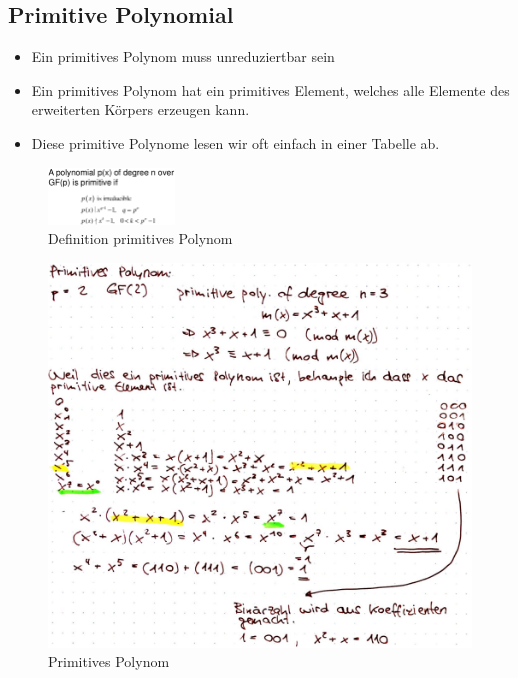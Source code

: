 \hypertarget{primitive-polynomial}{%
\subsection{Primitive Polynomial}\label{primitive-polynomial}}

\begin{itemize}
\tightlist
\item
  Ein primitives Polynom muss unreduziertbar sein
\item
  Ein primitives Polynom hat ein primitives Element, welches alle
  Elemente des erweiterten Körpers erzeugen kann.
\item
  Diese primitive Polynome lesen wir oft einfach in einer Tabelle ab.
\end{itemize}

\begin{figure}[H]
\centering
\includegraphics[width=0.3\textwidth]{figures/primitivePolynomial.png}
\caption{Definition primitives Polynom}
\end{figure}

\begin{figure}[H]
\centering
\includegraphics[width=1\textwidth]{figures/primitivesPolynom.png}
\caption{Primitives Polynom}
\end{figure}

\clearpage